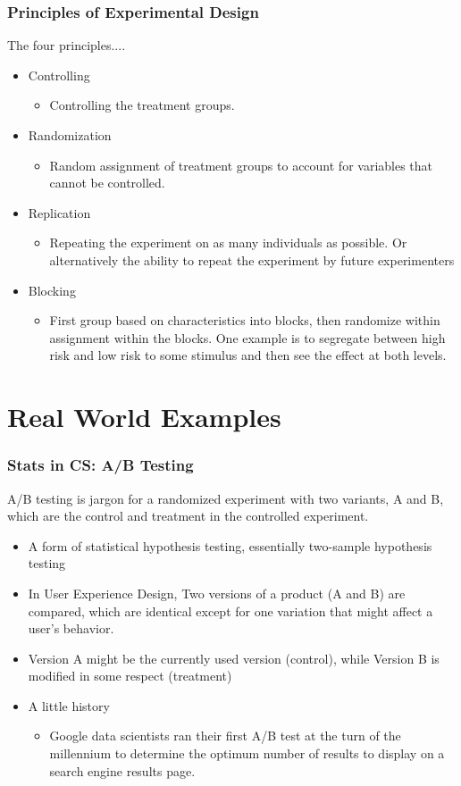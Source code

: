 \documentclass[mathserif]{beamer}
\begin{document}
\begin{frame}[t]
\frametitle{Principles of Experimental Design}
The four principles....
\begin{itemize}
	\item{Controlling}
	\begin{itemize}
		\item{Controlling the treatment groups.  }
	\end{itemize}
	\item{Randomization}
	\begin{itemize}
		\item{Random assignment of treatment groups to account for variables that cannot be controlled.}
	\end{itemize}
	\item{Replication}
	\begin{itemize}
		\item{Repeating the experiment on as many individuals as possible.  Or alternatively the ability to repeat the experiment by future experimenters}
	\end{itemize}
	\item{Blocking}
	\begin{itemize}
		\item{First group based on characteristics into blocks, then randomize within assignment within the blocks.  One example is to segregate between high risk and low risk to some stimulus and then see the effect at both levels.}
	\end{itemize}
\end{itemize}
\end{frame}


\section{Real World Examples}

\begin{frame}[t]
\frametitle{Stats in CS: A/B Testing}
A/B testing is jargon for a randomized experiment with two variants, A and B, which are the control and treatment in the controlled experiment.
\begin{itemize}
	\item{A form of statistical hypothesis testing, essentially two-sample hypothesis testing}
	\item{In User Experience Design, Two versions of a product (A and B) are compared, which are identical except for one variation that might affect a user's behavior. }
	\item{Version A might be the currently used version (control), while Version B is modified in some respect (treatment)}
	\item{A little history}
	\begin{itemize}
		\item{Google data scientists ran their first A/B test at the turn of the millennium to determine the optimum number of results to display on a search engine results page.}
	\end{itemize}
\end{itemize}

\end{frame}
\end{document}

